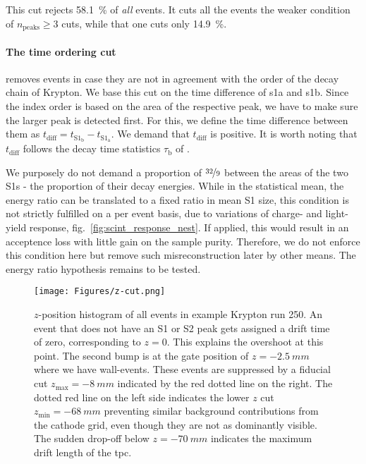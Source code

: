 This cut rejects \SI{58.1}{\%} of \emph{all} events. %
It cuts all the events the weaker condition of $ n_\mathrm{peaks} \ge 3 $ cuts, while that one cuts only \SI{14.9}{\%}.


\paragraph{The time ordering cut} removes events in case they are not in agreement with the order of the decay chain of Krypton.
We base this cut on the time difference of \gls{s1a} and \gls{s1b}.
Since the index order is based on the area of the respective peak, we have to make sure the larger peak is detected first.
For this, we define the time difference between them as $t_\mathrm{diff} = t_{\mathrm{S}1_\mathrm{b}} - t_{\mathrm{S}1_\mathrm{a}}$.
We demand that $t_\mathrm{diff}$ is positive.
It is worth noting that $t_\mathrm{diff}$ follows the decay time statistics $\tau_\mathrm{b}$ of . %

We purposely do not demand a proportion of $ \nicefrac{32}{9} $ between the areas of the two S1s - the proportion of their decay energies.
While in the statistical mean, the energy ratio can be translated to a fixed ratio in mean S1 size, this condition is not strictly fulfilled on a per event basis, due to variations of charge- and light-yield response, fig.~\ref{fig:scint_response_nest}.
If applied, this would result in an acceptence loss with little gain on the sample purity.
Therefore, we do not enforce this condition here but remove such misreconstruction later by other means.
The energy ratio hypothesis remains to be tested.

\begin{figure}[H]
    \centering
    \texttt{[image: Figures/z-cut.png]}  %
    \caption[Fiducial $ z $-cut]{
        $ z $-position histogram of all events in example Krypton run 250.
    An event that does not have an S1 or S2 peak gets assigned a drift time of zero, corresponding to $ z = 0 $.
    This explains the overshoot at this point.
    The second bump is at the gate position of $ z = \SI{-2.5}{mm}$ where we have wall-events.
    These events are suppressed by a fiducial cut $ z_\mathrm{max} = \SI{-8}{mm}$ indicated by the red dotted line on the right.
    The dotted red line on the left side indicates the lower $z$ cut $ z_\mathrm{min} = \SI{-68}{mm}$ preventing similar background contributions from the cathode grid,
    even though they are not as dominantly visible.
    The sudden drop-off below $ z = \SI{-70}{mm}$ indicates the maximum drift length of the \gls{tpc}.
    }
    \label{fig:fid-z-cut}
\end{figure}

